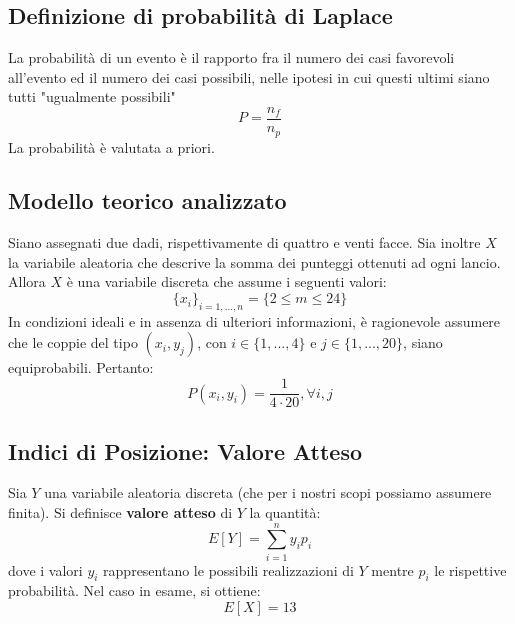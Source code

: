 \subsection{Definizione di probabilità di Laplace}
La probabilità di un evento è il rapporto fra il numero dei casi favorevoli all'evento ed il numero dei casi possibili, nelle ipotesi in cui questi ultimi siano tutti "ugualmente possibili"
\begin{equation}
	P=\frac{n_f}{n_p}
\end{equation}
La probabilità è valutata a priori.

\subsection{Modello teorico analizzato}
Siano assegnati due dadi, rispettivamente di quattro e venti facce. Sia inoltre $X$ la variabile aleatoria che descrive la somma dei punteggi ottenuti ad ogni lancio. Allora $X$ è una variabile discreta che assume i seguenti valori:
\begin{equation}
    \{x_i\}_{i=1,...,n} = \{2 \leq m \leq 24\}
\end{equation}
In condizioni ideali e in assenza di ulteriori informazioni, è ragionevole assumere che le coppie del tipo $(x_i, y_j)$, con $i \in \{1,...,4\}$ e $j \in \{1,...,20\}$, siano equiprobabili. Pertanto:
\begin{equation}
    P(x_i, y_i) = \frac{1}{4 \cdot 20}, \forall i, j
\end{equation}


\subsection{Indici di Posizione: Valore Atteso}
Sia $Y$ una variabile aleatoria discreta (che per i nostri scopi possiamo assumere finita). Si definisce \textbf{valore atteso} di $Y$ la quantità:
\begin{equation}
    E[Y] = \sum_{i=1}^{n} y_i p_i
\end{equation}
dove i valori $y_i$ rappresentano le possibili realizzazioni di $Y$ mentre $p_i$ le rispettive probabilità. Nel caso in esame, si ottiene:
\begin{equation}
    E[X] = 13
\end{equation}

